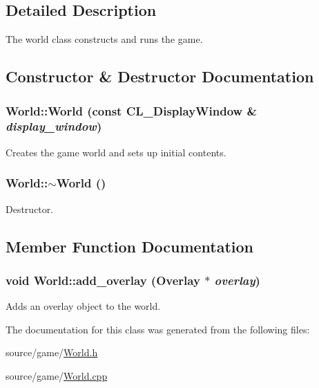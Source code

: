 \subsection{Detailed Description}
The world class constructs and runs the game. 

\subsection{Constructor \& Destructor Documentation}
\hypertarget{classWorld_aab6a1bf824c9e827eafcc1e54a5f798a}{
\subsubsection[{World}]{\setlength{\rightskip}{0pt plus 5cm}World::World (const CL\_\-DisplayWindow \& {\em display\_\-window})}}
\label{classWorld_aab6a1bf824c9e827eafcc1e54a5f798a}
Creates the game world and sets up initial contents. \hypertarget{classWorld_a8c73fba541a5817fff65147ba47cd827}{
\subsubsection[{$\sim$World}]{\setlength{\rightskip}{0pt plus 5cm}World::$\sim$World ()}}
\label{classWorld_a8c73fba541a5817fff65147ba47cd827}
Destructor. 

\subsection{Member Function Documentation}
\hypertarget{classWorld_a6f50eb99577e175c5019567418141dad}{
\subsubsection[{add\_\-overlay}]{\setlength{\rightskip}{0pt plus 5cm}void World::add\_\-overlay ({\bf Overlay} $\ast$ {\em overlay})}}
\label{classWorld_a6f50eb99577e175c5019567418141dad}
Adds an overlay object to the world. 

The documentation for this class was generated from the following files:\begin{DoxyCompactItemize}
\item 
source/game/\hyperlink{World_8h}{World.h}\item 
source/game/\hyperlink{World_8cpp}{World.cpp}\end{DoxyCompactItemize}
